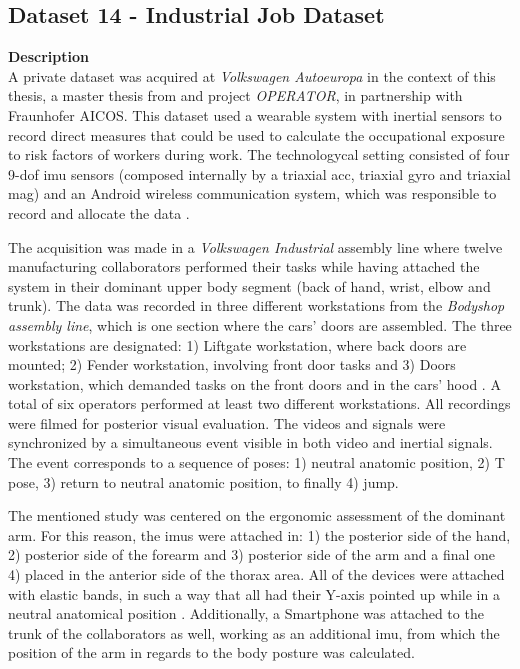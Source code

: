 \subsection{Dataset 14 - Industrial Job Dataset}
\label{dat:dataset_industry}
\textbf{Description}\hfill \\
A private dataset was acquired at \textit{Volkswagen Autoeuropa} in the context of this thesis, a master thesis from \cite{santos2019} and project \textit{OPERATOR}, in partnership with Fraunhofer AICOS. This dataset used a wearable system with inertial sensors to record direct measures that could be used to calculate the occupational exposure to risk factors of workers during work. The technologycal setting consisted of four 9-\gls{dof} \gls{imu} sensors (composed internally by a triaxial \gls{acc}, triaxial \gls{gyro} and triaxial \gls{mag}) and an Android wireless communication system, which was responsible to record and allocate the data \cite{santos2019}.
\par
The acquisition was made in a \textit{Volkswagen Industrial} assembly line where twelve manufacturing collaborators performed their tasks while having attached the system in their dominant upper body segment (back of hand, wrist, elbow and trunk). The data was recorded in three different workstations from the \textit{Bodyshop assembly line}, which is one section where the cars' doors are assembled. The three workstations are designated: 1) Liftgate workstation, where back doors are mounted; 2) Fender workstation, involving front door tasks and 3) Doors workstation, which demanded tasks on the front doors and in the cars' hood \cite{santos2019}. A total of six operators performed at least two different workstations. All recordings were filmed for posterior visual evaluation. The videos and signals were synchronized by a simultaneous event visible in both video and inertial signals. The event corresponds to a sequence of poses: 1) neutral anatomic position, 2) T pose, 3) return to neutral anatomic position, to finally 4) jump.

The mentioned study was centered on the ergonomic assessment of the dominant arm. For this reason, the \gls{imu}s  were attached in: 1) the posterior side of the hand, 2) posterior side of the forearm and 3) posterior side of the arm and a final one 4) placed in the anterior side of the thorax area. All of the devices were attached with elastic bands, in such a way that all had their Y-axis pointed up while in a neutral anatomical position \cite{sara2019}. Additionally, a Smartphone was attached to the trunk of the collaborators as well, working as an additional \gls{imu}, from which the position of the arm in regards to the body posture was calculated.

